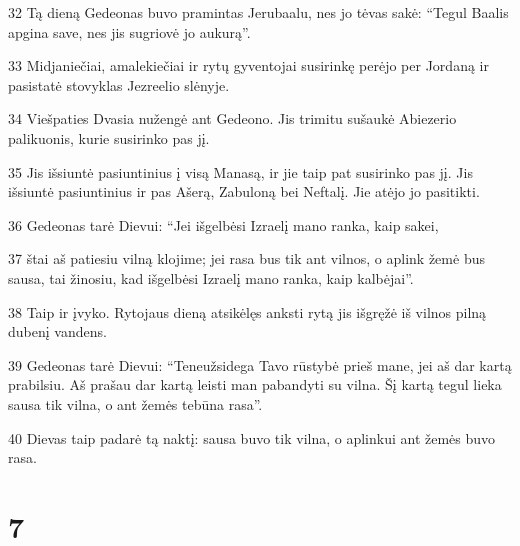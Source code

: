 \par 32 Tą dieną Gedeonas buvo pramintas Jerubaalu, nes jo tėvas sakė: “Tegul Baalis apgina save, nes jis sugriovė jo aukurą”. 
\par 33 Midjaniečiai, amalekiečiai ir rytų gyventojai susirinkę perėjo per Jordaną ir pasistatė stovyklas Jezreelio slėnyje. 
\par 34 Viešpaties Dvasia nužengė ant Gedeono. Jis trimitu sušaukė Abiezerio palikuonis, kurie susirinko pas jį. 
\par 35 Jis išsiuntė pasiuntinius į visą Manasą, ir jie taip pat susirinko pas jį. Jis išsiuntė pasiuntinius ir pas Ašerą, Zabuloną bei Neftalį. Jie atėjo jo pasitikti. 
\par 36 Gedeonas tarė Dievui: “Jei išgelbėsi Izraelį mano ranka, kaip sakei, 
\par 37 štai aš patiesiu vilną klojime; jei rasa bus tik ant vilnos, o aplink žemė bus sausa, tai žinosiu, kad išgelbėsi Izraelį mano ranka, kaip kalbėjai”. 
\par 38 Taip ir įvyko. Rytojaus dieną atsikėlęs anksti rytą jis išgręžė iš vilnos pilną dubenį vandens. 
\par 39 Gedeonas tarė Dievui: “Teneužsidega Tavo rūstybė prieš mane, jei aš dar kartą prabilsiu. Aš prašau dar kartą leisti man pabandyti su vilna. Šį kartą tegul lieka sausa tik vilna, o ant žemės tebūna rasa”. 
\par 40 Dievas taip padarė tą naktį: sausa buvo tik vilna, o aplinkui ant žemės buvo rasa.



\chapter{7}


